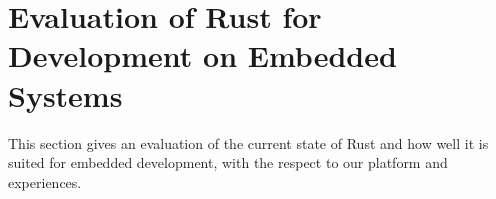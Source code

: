 
\section{Evaluation of Rust for Development on Embedded Systems}
\label{sec:rust_for_embedded}

This section gives an evaluation of the current state of Rust and how well it is suited for embedded development, with the respect to our platform and experiences.
